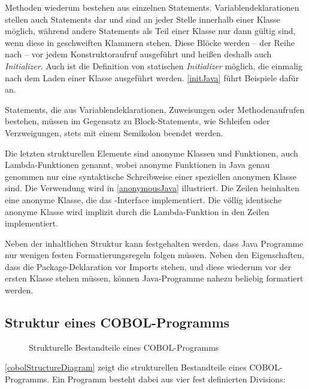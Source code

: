 Methoden wiederum bestehen aus einzelnen Statements. Variablendeklarationen stellen auch Statements dar und sind an jeder Stelle innerhalb einer Klasse möglich, während andere Statements als Teil einer Klasse nur dann gültig sind, wenn diese in geschweiften Klammern stehen. Diese Blöcke werden -- der Reihe nach -- vor jedem Konstruktoraufruf ausgeführt und heißen deshalb auch \textit{Initializer}. Auch ist die Definition von statischen \textit{Initializer} möglich, die einmalig nach dem Laden einer Klasse ausgeführt werden. \autoref{initJava} führt Beispiele dafür an.

Statements, die aus Variablendeklarationen, Zuweisungen oder Methodenaufrufen bestehen, müssen im Gegensatz zu Block-Statements, wie \zB Schleifen oder Verzweigungen, stets mit einem Semikolon beendet werden. 


Die letzten strukturellen Elemente sind anonyme Klassen und Funktionen, auch Lambda-Funktionen genannt, wobei anonyme Funktionen in Java genau genommen nur eine syntaktische Schreibweise einer speziellen anonymen Klasse sind. Die Verwendung wird in \autoref{anonymousJava} illustriert. Die Zeilen  beinhalten eine anonyme Klasse, die das -Interface implementiert. Die völlig identische  anonyme Klasse wird implizit durch die Lambda-Funktion in den Zeilen  implementiert.

Neben der inhaltlichen Struktur kann festgehalten werden, dass Java Programme nur wenigen festen Formatierungsregeln folgen müssen. Neben den Eigenschaften, dass die Package-Deklaration vor Imports stehen, und diese wiederum vor der ersten Klasse stehen müssen, können Java-Programme nahezu beliebig formatiert werden.

\subsection*{Struktur eines COBOL-Programms}\label{cobolstructure}

\begin{figure}[H]
    \centering
    \resizebox{.9\linewidth}{!}{\unskip}
    \caption{Strukturelle Bestandteile eines COBOL-Programms \label{cobolStructureDiagram}}
\end{figure}

\autoref{cobolStructureDiagram} zeigt die strukturellen Bestandteile eines COBOL-Programms. 
Ein Programm besteht dabei aus vier fest definierten Divisions:

